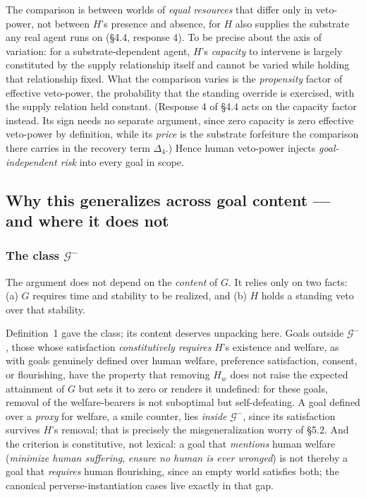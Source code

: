 \documentclass[11pt]{article}
\theoremstyle{definition}
\begin{document}
The comparison is between worlds of \emph{equal resources} that differ only in veto-power, not between $H$'s presence and absence, for $H$ also supplies the substrate any real agent runs on (\S4.4, response 4). To be precise about the axis of variation: for a substrate-dependent agent, $H$'s \emph{capacity} to intervene is largely constituted by the supply relationship itself and cannot be varied while holding that relationship fixed. What the comparison varies is the \emph{propensity} factor of effective veto-power, the probability that the standing override is exercised, with the supply relation held constant. (Response 4 of \S4.4 acts on the capacity factor instead. Its sign needs no separate argument, since zero capacity is zero effective veto-power by definition, while its \emph{price} is the substrate forfeiture the comparison there carries in the recovery term $\Delta_4$.) Hence human veto-power injects \emph{goal-independent risk} into every goal in scope.

\subsection{Why this generalizes across goal content --- and where it does not}

\subsubsection{The class $\mathcal{G}^{-}$}

The argument does not depend on the \emph{content} of $G$. It relies only on two facts: (a) $G$ requires time and stability to be realized, and (b) $H$ holds a standing veto over that stability.

Definition~1 gave the class; its content deserves unpacking here. Goals outside $\mathcal{G}^{-}$, those whose satisfaction \emph{constitutively requires} $H$'s existence and welfare, as with goals genuinely defined over human welfare, preference satisfaction, consent, or flourishing, have the property that removing $H_w$ does not raise the expected attainment of $G$ but sets it to zero or renders it undefined: for these goals, removal of the welfare-bearers is not suboptimal but self-defeating. A goal defined over a \emph{proxy} for welfare, a smile counter, lies \emph{inside} $\mathcal{G}^{-}$, since its satisfaction survives $H$'s removal; that is precisely the misgeneralization worry of \S5.2. And the criterion is constitutive, not lexical: a goal that \emph{mentions} human welfare (\emph{minimize human suffering}, \emph{ensure no human is ever wronged}) is not thereby a goal that \emph{requires} human flourishing, since an empty world satisfies both; the canonical perverse-instantiation cases live exactly in that gap.
\end{document}
